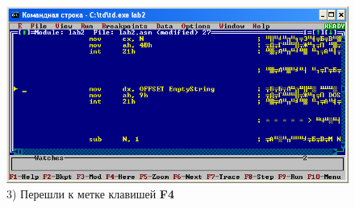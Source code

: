 \begin{figure}[!htp]
\begin {minipage}{0.32\textwidth}
    \end{minipage}
    \begin {minipage}{0.32\textwidth}
        \centering
        \includegraphics[width=.99\linewidth]
            {../_INCLUDES/task-4-8/3.png}
        \caption{3) Перешли к метке клавишей \textbf{F4}}
        \label{fig:task_4_8__3}
    \end{minipage}
\end{figure}
